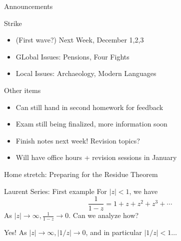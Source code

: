 \documentclass{beamer}
\begin{document}
\begin{frame}{Announcements}

  \begin{block}{\Xey Strike \Xey}
\begin{itemize}
  \item (First wave?) Next Week, December 1,2,3
  \item GLobal Issues: Pensions, Four Fights
  \item Local Issues: Archaeology, Modern Languages  
\end{itemize}
  \end{block}

  \begin{block}{Other items}
\begin{itemize}
  \item Can still hand in second homework for feedback
  \item Exam still being finalized, more information soon
    \item  Finish notes next week!  Revision topics?
    \item Will have office hours + revision sessions in January
\end{itemize}
\end{block}

  \begin{block}{Home stretch:}
Preparing for the Residue Theorem
      \end{block}
\end{frame}  

\begin{frame}{Laurent Series: First example}
  For $|z|<1$, we have
  $$\frac{1}{1-z}=1+z+z^2+z^3+\cdots$$
  As $|z|\to\infty, \frac{1}{1-z}\to 0$.  Can we analyze how?

  \begin{block}{Yes!}
    As $|z|\to\infty, |1/z|\to 0$, and in particular $|1/z|<1\dots$
  \end{block}

\end{frame}
\end{document}
